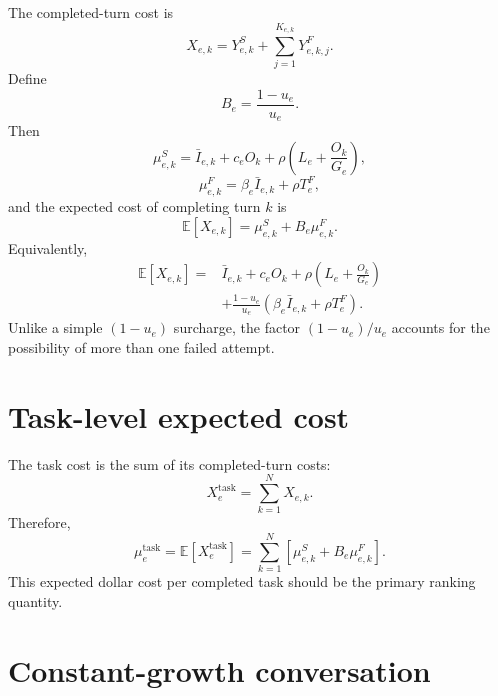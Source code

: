 \documentclass[11pt]{article}
\newcommand{\E}{\mathbb{E}}
\begin{document}
The completed-turn cost is
\begin{equation}
X_{e,k}=Y_{e,k}^S+\sum_{j=1}^{K_{e,k}}Y_{e,k,j}^F.
\end{equation}
Define
\begin{equation}
B_e=\frac{1-u_e}{u_e}.
\end{equation}
Then
\begin{equation}
\mu_{e,k}^S
=\bar I_{e,k}+c_eO_k
+\rho\left(L_e+\frac{O_k}{G_e}\right),
\end{equation}
\begin{equation}
\mu_{e,k}^F=\beta_e\bar I_{e,k}+\rho T_e^F,
\end{equation}
and the expected cost of completing turn $k$ is
\begin{equation}
\boxed{
\E[X_{e,k}]=\mu_{e,k}^S+B_e\mu_{e,k}^F
}.
\end{equation}
Equivalently,
\begin{equation}
\boxed{
\begin{aligned}
\E[X_{e,k}]
={}&\bar I_{e,k}+c_eO_k
+\rho\left(L_e+\frac{O_k}{G_e}\right) \\
&+\frac{1-u_e}{u_e}
\left(\beta_e\bar I_{e,k}+\rho T_e^F\right).
\end{aligned}
}
\end{equation}
Unlike a simple $(1-u_e)$ surcharge, the factor $(1-u_e)/u_e$ accounts for
the possibility of more than one failed attempt.

\section{Task-level expected cost}

The task cost is the sum of its completed-turn costs:
\begin{equation}
X_e^{\mathrm{task}}=\sum_{k=1}^{N}X_{e,k}.
\end{equation}
Therefore,
\begin{equation}
\boxed{
\mu_e^{\mathrm{task}}
=\E[X_e^{\mathrm{task}}]
=\sum_{k=1}^{N}\left[\mu_{e,k}^S+B_e\mu_{e,k}^F\right]
}.
\end{equation}
This expected dollar cost per completed task should be the primary ranking
quantity.

\section{Constant-growth conversation}
\end{document}
